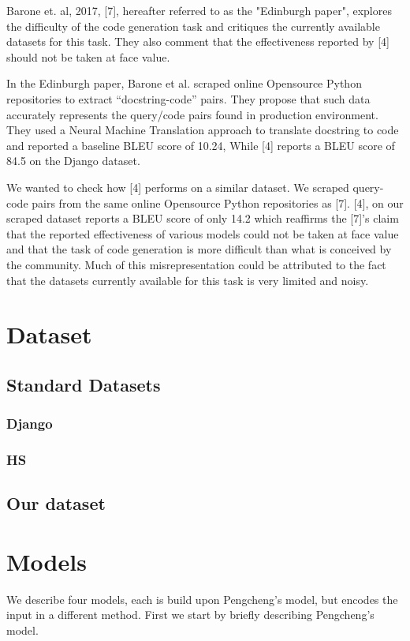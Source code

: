 \documentclass{IEEEtran}
\begin{document}
    Barone et. al, 2017, [7], hereafter referred to as the "Edinburgh paper",
    explores the difficulty of the code generation task and critiques
    the currently available datasets for this task. They also comment that
    the effectiveness reported by [4] should not be taken at face value.

    In the Edinburgh paper, Barone et al. scraped online Opensource Python
    repositories to extract ``docstring-code'' pairs. They propose that
    such data accurately represents the query/code pairs found in
    production environment. They used a Neural Machine Translation
    approach to translate docstring to code and reported a baseline
    BLEU score of 10.24, While [4] reports a BLEU score of 84.5 on the
    Django dataset.

    We wanted to check how [4] performs on a similar dataset.
    We scraped query-code pairs from the same online Opensource Python repositories as [7].
    [4], on our scraped dataset reports a BLEU score of only 14.2 which reaffirms
    the [7]'s claim that the reported effectiveness of various
    models could not be taken at face value and that the task of code generation
    is more difficult than what is conceived by the community.
    Much of this misrepresentation could be attributed to the fact that the
    datasets currently available for this task is very limited and noisy.

    \section{Dataset}
      \subsection{Standard Datasets}
        \blindtext
        \subsubsection{Django}
        \blindtext
        \subsubsection{HS}
        \blindtext
      \subsection{Our dataset}
      \blindtext

    \section{Models}
    We describe four models, each is build upon Pengcheng's model, but encodes the input in a 
    different method. First we start by briefly describing Pengcheng's model.
\end{document}
